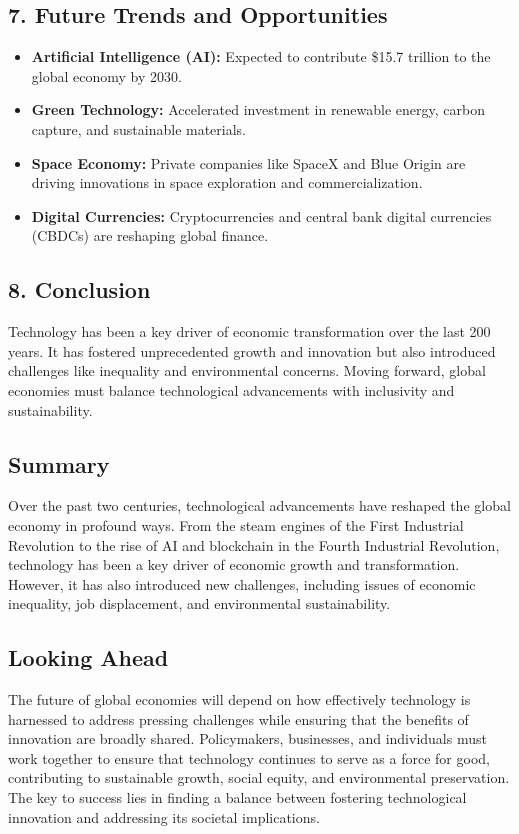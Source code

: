 \documentclass{article}
\begin{document}
\subsection*{7. Future Trends and Opportunities}
\begin{itemize}
    \item \textbf{Artificial Intelligence (AI):} Expected to contribute \$15.7 trillion to the global economy by 2030.
    \item \textbf{Green Technology:} Accelerated investment in renewable energy, carbon capture, and sustainable materials.
    \item \textbf{Space Economy:} Private companies like SpaceX and Blue Origin are driving innovations in space exploration and commercialization.
    \item \textbf{Digital Currencies:} Cryptocurrencies and central bank digital currencies (CBDCs) are reshaping global finance.
\end{itemize}

\subsection*{8. Conclusion}
Technology has been a key driver of economic transformation over the last 200 years. It has fostered unprecedented growth and innovation but also introduced challenges like inequality and environmental concerns. Moving forward, global economies must balance technological advancements with inclusivity and sustainability.



\subsection*{Summary}
Over the past two centuries, technological advancements have reshaped the global economy in profound ways. From the steam engines of the First Industrial Revolution to the rise of AI and blockchain in the Fourth Industrial Revolution, technology has been a key driver of economic growth and transformation. However, it has also introduced new challenges, including issues of economic inequality, job displacement, and environmental sustainability. 

\subsection*{Looking Ahead}
The future of global economies will depend on how effectively technology is harnessed to address pressing challenges while ensuring that the benefits of innovation are broadly shared. Policymakers, businesses, and individuals must work together to ensure that technology continues to serve as a force for good, contributing to sustainable growth, social equity, and environmental preservation. The key to success lies in finding a balance between fostering technological innovation and addressing its societal implications.
\end{document}

